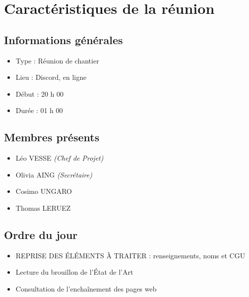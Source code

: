 \section{Caractéristiques de la réunion}
    \subsection{Informations générales}
        \begin{itemize}[label=\textbullet]
            \item Type : Réunion de chantier
            \item Lieu : Discord, en ligne  %
            \item Début : 20 h 00           %
            \item Durée : 01 h 00           %
        \end{itemize}

    \subsection{Membres présents}
        \begin{itemize}[label=\textbullet]
            \item Léo VESSE \textit{(Chef de Projet)} 
            \item Olivia AING \textit{(Secrétaire)}      %
            \item Cosimo UNGARO
            \item Thomas LERUEZ
        \end{itemize}

    \subsection{Ordre du jour}
        \begin{itemize}[label=\textbullet]
            \item REPRISE DES ÉLÉMENTS À TRAITER : renseignements, noms et CGU
            \item Lecture du brouillon de l'État de l'Art
            \item Consultation de l'enchaînement des pages web
        \end{itemize}

